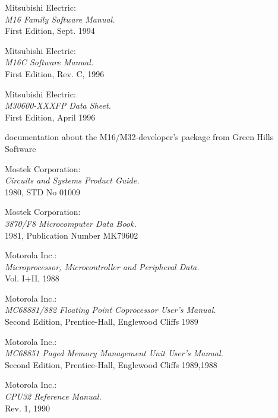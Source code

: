  Mitsubishi Electric: \\
                 {\em M16 Family Software Manual.\/} \\
                 First Edition, Sept. 1994

 Mitsubishi Electric: \\
      	          {\em M16C Software Manual.\/} \\
                  First Edition, Rev. C, 1996

 Mitsubishi Electric: \\
                   {\em M30600-XXXFP Data Sheet.\/} \\
                   First Edition, April 1996

 documentation about the M16/M32-developer's package
                   from Green Hills Software

 Mostek Corporation: \\
                     {\em Circuits and Systems Product Guide.\/} \\
                     1980, STD No 01009

 Mostek Corporation: \\
                     {\em 3870/F8 Microcomputer Data Book.\/} \\
                     1981, Publication Number MK79602

 Motorola Inc.: \\
                 {\em Microprocessor, Microcontroller and Peripheral
                 Data.\/} \\
		 Vol. I+II, 1988

 Motorola Inc.: \\
                {\em MC68881/882 Floating Point Coprocessor User's
                Manual.\/} \\
                Second Edition, Prentice-Hall, Englewood Cliffs 1989

 Motorola Inc.: \\
                {\em MC68851 Paged Memory Management Unit User's
                Manual.\/} \\
                Second Edition, Prentice-Hall, Englewood Cliffs 1989,1988

 Motorola Inc.: \\
                {\em CPU32 Reference Manual.\/} \\
                Rev. 1, 1990

